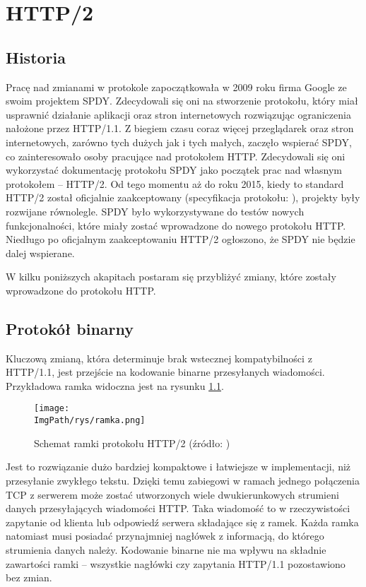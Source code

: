 \documentclass[a4paper,12pt,twoside,openany]{report}
\newcommand{\ImgPath}{.}
\begin{document}
\chapter{HTTP/2}

\section{Historia}
\label{sectionHistoria}
Pracę nad zmianami w protokole zapoczątkowała w 2009 roku firma Google ze swoim projektem SPDY.
Zdecydowali się oni na stworzenie protokołu, który miał usprawnić działanie aplikacji oraz stron internetowych rozwiązując ograniczenia nałożone przez HTTP/1.1.
Z biegiem czasu coraz więcej przeglądarek oraz stron internetowych, zarówno tych dużych jak i tych małych, zaczęło wspierać SPDY, co zainteresowało osoby pracujące nad protokołem HTTP.
Zdecydowali się oni wykorzystać dokumentację protokołu SPDY jako początek prac nad własnym protokołem -- HTTP/2.
Od tego momentu aż do roku 2015, kiedy to standard HTTP/2 został oficjalnie zaakceptowany 
(specyfikacja protokołu: \cite{RFC7540}), projekty były rozwijane równolegle.
SPDY było wykorzystywane do testów nowych funkcjonalności, które miały zostać wprowadzone do nowego protokołu HTTP.
Niedługo po oficjalnym zaakceptowaniu HTTP/2 ogłoszono, że SPDY nie będzie dalej wspierane.

W kilku poniższych akapitach postaram się przybliżyć zmiany, które zostały wprowadzone do protokołu HTTP.

\section{Protokół binarny}
\label{sectionProtokolBinarny}

Kluczową zmianą, która determinuje brak wstecznej kompatybilności z HTTP/1.1, jest przejście na kodowanie binarne przesyłanych wiadomości. Przykładowa ramka widoczna jest na rysunku \ref{schematRamki}.
\begin{figure}[!htbp]
	\begin{center}
\centering
\texttt{[image: \\ImgPath/rys/ramka.png]}
\end{center}
	\caption{Schemat ramki protokołu HTTP/2 (źródło: \cite{http2Fundamentals})}
	\label{schematRamki}
\end{figure}
Jest to rozwiązanie dużo bardziej kompaktowe i łatwiejsze w implementacji, niż przesyłanie zwykłego tekstu.
Dzięki temu zabiegowi w ramach jednego połączenia TCP z serwerem może zostać utworzonych wiele dwukierunkowych strumieni danych przesyłających wiadomości HTTP.
Taka wiadomość to w rzeczywistości zapytanie od klienta lub odpowiedź serwera składające się z ramek.
Każda ramka natomiast musi posiadać przynajmniej nagłówek z informacją, do którego strumienia danych należy.
Kodowanie binarne nie ma wpływu na składnie zawartości ramki -- wszystkie nagłówki czy zapytania HTTP/1.1 pozostawiono bez zmian.
\end{document}
